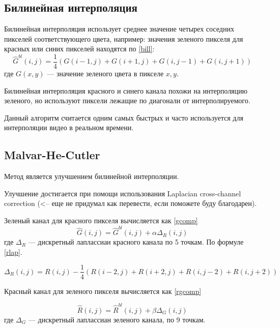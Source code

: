 
\newpage 

\subsection{Билинейная интерполяция}
Билинейная интерполяция использует среднее значение четырех соседних пикселей соответствующего цвета, например: значения зеленого пикселя для красных или синих пикселей находятся по \ref{bill}:
\begin{equation}
	\label{bill}
	\hat{G}^{bl}(i,j) = \frac{1}{4}(G(i-1,j) + G(i+1,j) + G(i,j-1) + G(i,j+1))
\end{equation}
где $G(x,y)$ --- значение зеленого цвета в пикселе $x,y$. \cite{mhcd}

Билинейная интерполяция красного и синего канала похожи на интерполяцию зеленого, но используют пиксели лежащие по диагонали от интерполируемого.

Данный алгоритм считается одним самых быстрых и часто используется для интерполяции видео в реальном времени. \cite{bilinear}

\subsection{Malvar-He-Cutler}

Метод является улучшением билинейной интерполяции.

Улучшение достигается при помощи использования Laplacian cross-channel correction (<-- еще не придумал как перевести, если поможете буду благодарен). 

Зеленый канал для красного пикселя вычисляется как \ref{gcomp}
\begin{equation}
	\label{gcomp}
	\hat{G}(i,j) = \hat{G}^{bl}(i,j) + \alpha\Delta_{R}(i,j) 
\end{equation}
где $\Delta_{R}$ --- дискретный лаплассиан красного канала по 5 точкам. По формуле \ref{rlap}.

\begin{equation}
	\label{rlap}
	\Delta_{R}(i,j) = R(i,j) - \frac{1}{4} (R(i-2,j) + R(i+2,j)+R(i,j-2)+R(i,j+2))
\end{equation}

Красный канал для зеленого пикселя вычисляется как \ref{rgcomp}

\begin{equation}
	\label{rgcomp}
	\hat{R}(i,j) = \hat{R}^{bl}(i,j) + \beta\Delta_{G}(i,j) 
\end{equation}
где $\Delta_{G}$ --- дискретный лаплассиан зеленого канала, по 9 точкам.

